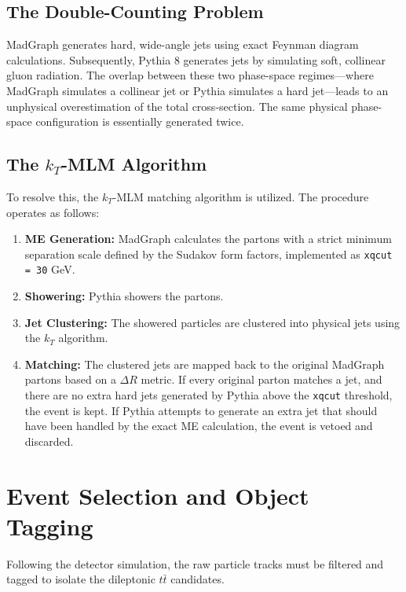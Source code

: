\documentclass[11pt,a4paper]{article}
\begin{document}
\subsection{The Double-Counting Problem}
MadGraph generates hard, wide-angle jets using exact Feynman diagram calculations. Subsequently, Pythia 8 generates jets by simulating soft, collinear gluon radiation. The overlap between these two phase-space regimes—where MadGraph simulates a collinear jet or Pythia simulates a hard jet—leads to an unphysical overestimation of the total cross-section. The same physical phase-space configuration is essentially generated twice.

\subsection{The $k_T$-MLM Algorithm}
To resolve this, the $k_T$-MLM matching algorithm \cite{mlm_matching} is utilized. The procedure operates as follows:
\begin{enumerate}
    \item \textbf{ME Generation:} MadGraph calculates the partons with a strict minimum separation scale defined by the Sudakov form factors, implemented as \texttt{xqcut = 30} GeV.
    \item \textbf{Showering:} Pythia showers the partons.
    \item \textbf{Jet Clustering:} The showered particles are clustered into physical jets using the $k_T$ algorithm.
    \item \textbf{Matching:} The clustered jets are mapped back to the original MadGraph partons based on a $\Delta R$ metric. If every original parton matches a jet, and there are no extra hard jets generated by Pythia above the \texttt{xqcut} threshold, the event is kept. If Pythia attempts to generate an extra jet that should have been handled by the exact ME calculation, the event is vetoed and discarded.
\end{enumerate}

\section{Event Selection and Object Tagging}
Following the detector simulation, the raw particle tracks must be filtered and tagged to isolate the dileptonic $t\bar{t}$ candidates. 
\end{document}
